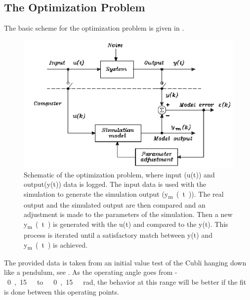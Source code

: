 \subsection{The Optimization Problem}
The basic scheme for the optimization problem is given in .
%
\begin{figure}[H]
	\centering
	\includegraphics[scale=0.4]{figures/SensToolSchema}
%	
	\caption{Schematic of the optimization problem, where input (u(t)) and output(y(t)) data is logged. The input data is used with the simulation to generate the simulation output (\si{y_{m}(t)}). The real output and the simulated output are then compared and an adjustment is made to the parameters of the simulation. Then a new \si{y_{m}(t)} is generated with the u(t) and compared to the y(t). This process is iterated until a satisfactory match between y(t) and \si{y_{m}(t)} is achieved\cite{Senstools}.}
	\label{SensToolSchema}
\end{figure}
%
The provided data is taken from an initial value test of the Cubli hanging down like a pendulum, see .
As the operating angle goes from \si{-0,15\ to\ 0,15\ rad}, the behavior at this range will be better if the fit is done between this operating points. 

